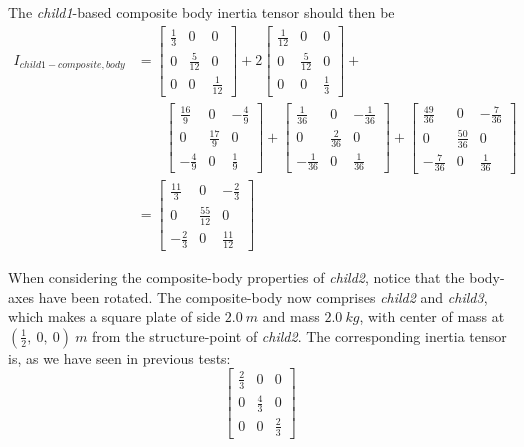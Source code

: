 \begin{description}
The \textit{child1}-based composite body inertia tensor should then be
\begin{equation*}
\begin{split}
I_{child1-composite,body} & =
    \begin{bmatrix} \frac{1}{3} & 0   & 0  \\
                   0  & \frac{5}{12} & 0   \\
                    0  & 0   & \frac{1}{12}
   \end{bmatrix}
   +2
   \begin{bmatrix} \frac{1}{12} & 0   & 0  \\
                   0   & \frac{5}{12} & 0   \\
                    0  & 0   & \frac{1}{3}
   \end{bmatrix}
   +\\
    & \ \ \ \ \ \ \ \ \
\begin{bmatrix} \frac{16}{9} & 0   & -\frac{4}{9}  \\
                   0   & \frac{17}{9} & 0   \\
                    -\frac{4}{9}  & 0   & \frac{1}{9}
   \end{bmatrix}
  +
\begin{bmatrix} \frac{1}{36} & 0   & -\frac{1}{36}  \\
                   0   & \frac{2}{36} & 0   \\
                    -\frac{1}{36}  & 0   & \frac{1}{36}
   \end{bmatrix}
   +
\begin{bmatrix} \frac{49}{36} & 0   & -\frac{7}{36}  \\
                   0   & \frac{50}{36} & 0   \\
                    -\frac{7}{36}  & 0   & \frac{1}{36}
   \end{bmatrix}
    \\
   & =
   \begin{bmatrix} \frac{11}{3} & 0   & -\frac{2}{3}  \\
                   0   & \frac{55}{12} & 0   \\
                    -\frac{2}{3}  & 0   & \frac{11}{12}
   \end{bmatrix}
\end{split}
\end{equation*}

When considering the composite-body properties of \textit{child2}, notice that
the body-axes have been rotated.  The composite-body now comprises
\textit{child2} and \textit{child3}, which makes a square plate of side
$2.0~m$ and mass $2.0~kg$, with center of mass at $(\frac{1}{2},~0,~0)~m$ from
the structure-point of \textit{child2}.  The corresponding inertia tensor is,
as we have seen in previous tests:
\begin{equation*}
\begin{bmatrix} \frac{2}{3} & 0   & 0  \\
                   0  & \frac{4}{3} & 0   \\
                    0  & 0   & \frac{2}{3}
   \end{bmatrix}
\end{equation*}


\end{description}
